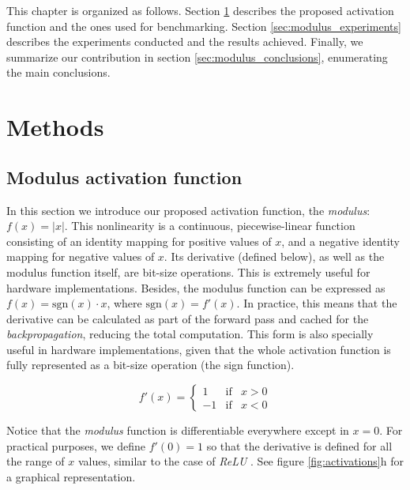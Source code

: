This chapter is organized as follows. Section \ref{sec:modulus_methods} describes the proposed activation function and the ones used for benchmarking. Section \ref{sec:modulus_experiments} describes the experiments conducted and the results achieved. Finally, we summarize our contribution in section \ref{sec:modulus_conclusions}, enumerating the main conclusions.



\section{Methods} \label{sec:modulus_methods}
\subsection{Modulus activation function}
In this section we introduce our proposed activation function, the \textit{modulus}: $f(x)=|x|$. This nonlinearity is a continuous, piecewise-linear function consisting of an identity mapping for positive values of $x$, and a negative identity mapping for negative values of $x$. Its derivative (defined below), as well as the modulus function itself, are bit-size operations. This is extremely useful for hardware implementations. Besides, the modulus function can be expressed as $f(x) = \text{sgn}(x)\cdot x$, where $\text{sgn}(x) = f'(x)$. In practice, this means that the derivative can be calculated as part of the forward pass and cached for the \textit{backpropagation}, reducing the total computation. This form is also specially useful in hardware implementations, given that the whole activation function is fully represented as a bit-size operation (the sign function).

$$
f'(x)= \left\{ \begin{array}{lcc}
1 &   \text{if}  & x > 0 \\
-1 &  \text{if} & x < 0
\end{array} \right.
$$

Notice that the \textit{modulus} function is differentiable everywhere except in $x = 0$. For practical purposes, we define $f'(0) = 1$ so that the derivative is defined for all the range of $x$ values, similar to the case of \textit{ReLU} \autocite{Goodfellow2016}. See figure \ref{fig:activations}h for a graphical representation.


